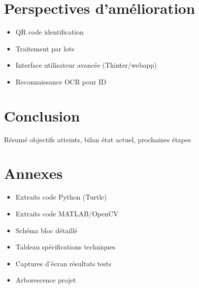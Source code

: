 \documentclass[a4paper,11pt]{article}
\begin{document}
\section{Perspectives d'amélioration}
\begin{itemize}
    \item QR code identification
    \item Traitement par lots
    \item Interface utilisateur avancée (Tkinter/webapp)
    \item Reconnaissance OCR pour ID
\end{itemize}

\section{Conclusion}
Résumé objectifs atteints, bilan état actuel, prochaines étapes

\appendix

\section{Annexes}
\begin{itemize}
    \item Extraits code Python (Turtle)
    \item Extraits code MATLAB/OpenCV
    \item Schéma bloc détaillé
    \item Tableau spécifications techniques
    \item Captures d'écran résultats tests
    \item Arborescence projet
\end{itemize}
\end{document}
